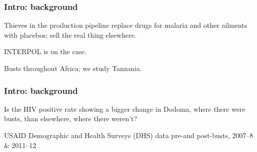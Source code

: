 \documentclass[11pt,final,hyperref={pdfpagelabels=false},xcolor=dvipsnames]{beamer}
\begin{document}
\begin{frame}[fragile]\frametitle{Intro: background}

\hfill {}

    \begin{Witemize}
\setlength{\itemsep}{3pt}
\setlength{\parskip}{0pt}
\setlength{\parsep}{0pt}
\item Thieves in the production pipeline replace drugs for malaria and other ailments with placebos; sell the real thing elsewhere.
        \pause
        \item  INTERPOL is on the case.
        \pause
        \item  Busts throughout Africa; we study Tanzania.
    \end{Witemize}

\end{frame}



\begin{frame}[fragile]\frametitle{Intro: background}

    \begin{Witemize}
\setlength{\itemsep}{3pt}
\setlength{\parskip}{0pt}
\setlength{\parsep}{0pt}
\item Is the HIV positive rate showing a bigger change in Dodoma, where there were busts,
    than elsewhere, where there weren't?
\item USAID Demographic and Health Surveys (DHS) data pre-and post-busts, 2007--8 \& 2011--12
    \end{Witemize}
\end{frame}
\end{document}
